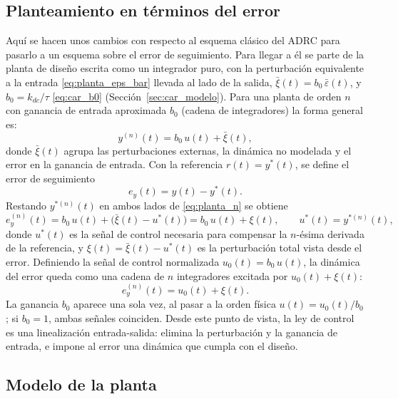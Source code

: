\subsection{Planteamiento en términos del error}
\label{subsec:error}
Aquí se hacen unos cambios con respecto al esquema clásico del ADRC para pasarlo a un esquema sobre
el error de seguimiento. Para llegar a él se parte de la planta de diseño escrita como un integrador
puro, con la perturbación equivalente a la entrada \eqref{eq:planta_eps_bar} llevada al lado de la
salida, $\bar{\xi}(t) = b_0\,\bar{\varepsilon}(t)$, y $b_0 = k_{dc}/\tau$ \eqref{eq:car_b0}
(Sección~\ref{sec:car_modelo}). Para una planta de orden $n$ con ganancia de entrada aproximada $b_0$
(cadena de integradores) la forma general es:
\begin{equation}
y^{(n)}(t) = b_0\,u(t) + \bar{\xi}(t),
\label{eq:planta_n}
\end{equation}
donde $\bar{\xi}(t)$ agrupa las perturbaciones externas, la dinámica no modelada y
el error en la ganancia de entrada. Con la referencia $r(t) = y^*(t)$, se define el
error de seguimiento
\begin{equation}
e_y(t) = y(t) - y^*(t) .
\end{equation}
Restando $y^{*(n)}(t)$ en ambos lados de \eqref{eq:planta_n} se obtiene
\begin{equation}
e_y^{(n)}(t) = b_0\,u(t) + \bigl(\bar{\xi}(t) - u^*(t)\bigr) = b_0\,u(t) + \xi(t),
\qquad u^*(t) = y^{*(n)}(t),
\label{eq:error_n}
\end{equation}
donde $u^*(t)$ es la señal de control necesaria para compensar la $n$-ésima
derivada de la referencia, y $\xi(t) = \bar{\xi}(t) - u^*(t)$ es la perturbación total vista desde el
error. Definiendo la señal de control normalizada $u_0(t) = b_0\,u(t)$, la dinámica del
error queda como una cadena de $n$ integradores excitada por $u_0(t) + \xi(t)$:
\begin{equation}
e_y^{(n)}(t) = u_0(t) + \xi(t) .
\label{eq:error_norm}
\end{equation}
La ganancia $b_0$ aparece una sola vez, al pasar a la orden física
$u(t) = u_0(t)/b_0$; si $b_0 = 1$, ambas señales coinciden. Desde este punto de vista, la ley de control es una
linealización entrada-salida: elimina la perturbación y la ganancia de entrada,
e impone al error una dinámica que cumpla con el diseño.
 
\subsection{Modelo de la planta}
\label{subsec:planta}
 
